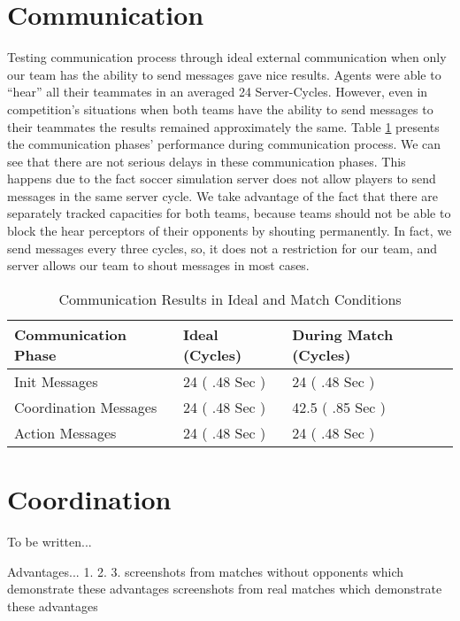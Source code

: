 \section{Communication}
Testing communication process through ideal external communication when only our team has the ability to send messages gave nice results. Agents were able to ``hear'' all their teammates in an averaged 24 Server-Cycles. However, even in competition's situations when both teams have the ability to send messages to their teammates the results remained approximately the same. Table \ref{CommunicationResults} presents the communication phases' performance during communication process. We can see that there are not serious delays in these communication phases. This happens due to the fact soccer simulation server does not allow players to send messages in the same server cycle. We take advantage of the fact that there are separately tracked capacities for both teams, because teams should not be able to block the hear perceptors of their opponents by shouting permanently. In fact, we send  messages every three cycles, so, it does not a restriction for our team, and server allows our team to shout messages in most cases.

\begin{table}
\begin{center}
    \begin{tabular}{ | l | l | l |}
    \hline
    \textbf{Communication Phase} 	& Ideal (Cycles) 			& During Match (Cycles) \\ \hline
    Init Messages 					& 24  ( .48 Sec ) 			& 24 	( .48 Sec )		 \\ \hline	
    Coordination Messages			& 24  ( .48 Sec )			& 42.5  ( .85 Sec )			 \\ \hline
    Action Messages 				& 24  ( .48 Sec )			& 24 ( .48 Sec )	 		 \\ 
    \hline
    \end{tabular}
\end{center}
\label{CommunicationResults}
\caption{Communication Results in Ideal and Match Conditions}
\end{table}

\section{Coordination}
To be written...

Advantages...
1.
2.
3.
screenshots from matches without opponents which demonstrate these advantages
screenshots from real matches which demonstrate these advantages

